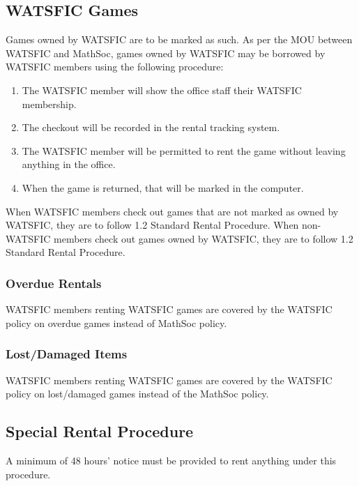 \subsection{WATSFIC Games}
Games owned by WATSFIC are to be marked as such. As per the MOU between WATSFIC and MathSoc, games owned by WATSFIC may be borrowed by WATSFIC members using the following procedure:
\begin{enumerate}
    \item The WATSFIC member will show the office staff their WATSFIC membership.
    \item The checkout will be recorded in the rental tracking system.
    \item The WATSFIC member will be permitted to rent the game without leaving anything in the office.
    \item When the game is returned, that will be marked in the computer.
\end{enumerate}

When WATSFIC members check out games that are not marked as owned by WATSFIC, they are to follow 1.2 Standard Rental Procedure. When non-WATSFIC members check out games owned by WATSFIC, they are to follow 1.2 Standard Rental Procedure.

\subsubsection{Overdue Rentals}
WATSFIC members renting WATSFIC games are covered by the WATSFIC policy on overdue games instead of MathSoc policy.

\subsubsection{Lost/Damaged Items}
WATSFIC members renting WATSFIC games are covered by the WATSFIC policy on lost/damaged games instead of the MathSoc policy.

\subsection{Special Rental Procedure}
A minimum of 48 hours' notice must be provided to rent anything under this procedure.


